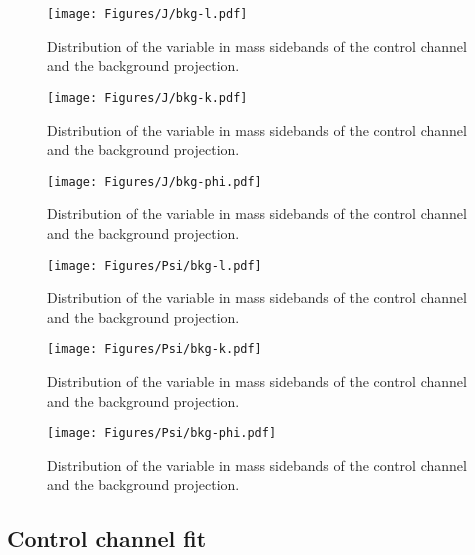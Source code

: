 \begin{figure}[!hbt]
  \centering
  \texttt{[image: Figures/J/bkg-l.pdf]}
  \caption{Distribution of the \cTL variable in mass sidebands of the \BtoKstJpsi control channel and the background \pdf projection.}
  \label{fig:back-l-bin4}
\end{figure}

\begin{figure}[!hbt]
  \centering
  \texttt{[image: Figures/J/bkg-k.pdf]}
  \caption{Distribution of the \cTK variable in mass sidebands of the \BtoKstJpsi control channel and the background \pdf projection.}
  \label{fig:back-k-bin4}
\end{figure}

\begin{figure}[!hbt]
  \centering
  \texttt{[image: Figures/J/bkg-phi.pdf]}
  \caption{Distribution of the \PHI variable in mass sidebands of the \BtoKstJpsi control channel and the background \pdf projection.}
  \label{fig:back-phi-bin4}
\end{figure}

\begin{figure}[!hbt]
  \centering
  \texttt{[image: Figures/Psi/bkg-l.pdf]}
  \caption{Distribution of the \cTL variable in mass sidebands of the \BtoKstpsip control channel and the background \pdf projection.}
  \label{fig:back-l-bin6}
\end{figure}

\begin{figure}[!hbt]
  \centering
  \texttt{[image: Figures/Psi/bkg-k.pdf]}
  \caption{Distribution of the \cTK variable in mass sidebands of the \BtoKstpsip control channel and the background \pdf projection.}
  \label{fig:back-k-bin6}
\end{figure}

\begin{figure}[!hbt]
  \centering
  \texttt{[image: Figures/Psi/bkg-phi.pdf]}
  \caption{Distribution of the \PHI variable in mass sidebands of the \BtoKstpsip control channel and the background \pdf projection.}
  \label{fig:back-phi-bin6}
\end{figure}


\subsection{Control channel fit}
\label{sec:fitcc}

